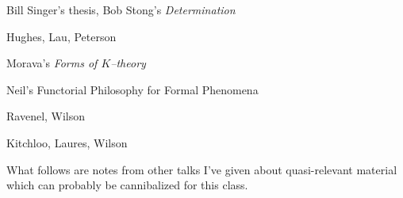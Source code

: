 \documentclass[12pt]{book}
\newcommand{\<}{\langle}
\renewcommand{\>}{\rangle}
\numberwithin{equation}{section}
\theoremstyle{plain}
\theoremstyle{definition}
\theoremstyle{remark}
\begin{document}
Bill Singer's thesis, Bob Stong's \textit{Determination}

Hughes, Lau, Peterson

Morava's \textit{Forms of $K$--theory}

Neil's Functorial Philosophy for Formal Phenomena

Ravenel, Wilson

Kitchloo, Laures, Wilson




\newpage
\newpage
\newpage

\vspace{20\baselineskip}

\begin{center}
What follows are notes from other talks I've given about quasi-relevant material which can probably be cannibalized for this class.
\end{center}




\end{document}
